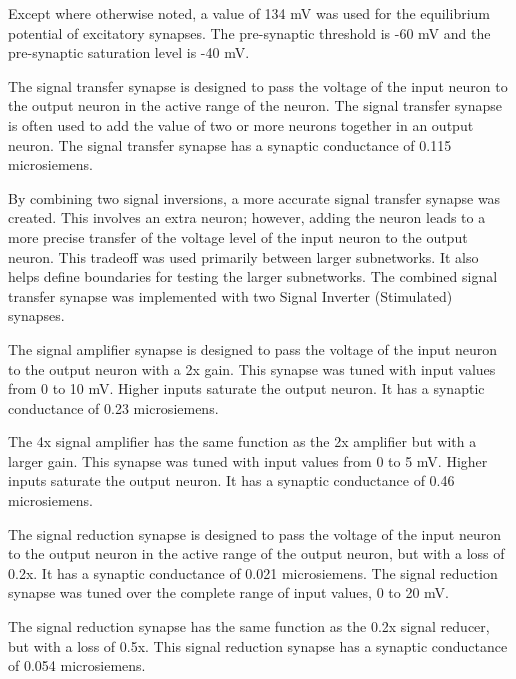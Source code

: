 
Except where otherwise noted, a value of 134 mV was used for the equilibrium
potential of excitatory synapses. The pre-synaptic threshold is -60 mV and the pre-synaptic saturation
level is -40 mV.


The signal transfer synapse is designed to pass the voltage of the input neuron
to the output neuron in the active range of the neuron. The signal transfer synapse is often used to add
the value of two or more neurons together in an output neuron.
The signal transfer synapse has a synaptic 
conductance of 0.115 microsiemens. 


By combining two signal inversions, a more accurate signal transfer synapse was
created. This involves an extra neuron; however, adding the neuron leads to a more precise
transfer of the voltage level of the input neuron to the output neuron. This tradeoff was used primarily between larger subnetworks. It also helps define boundaries for testing the larger subnetworks. The combined signal transfer synapse was implemented with two Signal Inverter (Stimulated)
synapses.


The signal amplifier synapse is designed to pass the voltage of the input neuron
to the output neuron with a 2x gain. This synapse was tuned with input values from 0 to
10 mV. Higher inputs saturate the output neuron. It has a synaptic conductance
of 0.23 microsiemens.


The 4x signal amplifier has the same function as the 2x amplifier but with a larger 
gain. This synapse was tuned with input values from 0 to
5 mV. Higher inputs saturate the output neuron. It has a synaptic conductance
of 0.46 microsiemens.


The signal reduction synapse is designed to pass the voltage of the input neuron
to the output neuron in the active range of the output neuron, but with a loss of 0.2x. 
It has a synaptic  conductance of 0.021 microsiemens. The signal reduction synapse was tuned
over the complete range of input values, 0 to 20 mV.


The signal reduction synapse has the same function as the 0.2x signal reducer, but with a loss of 0.5x. This signal reduction synapse has a synaptic  conductance of 0.054 microsiemens.

